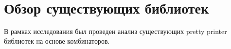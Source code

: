\section{Обзор существующих библиотек}

В рамках исследования был проведен анализ существующих pretty printer библиотек на основе комбинаторов.


